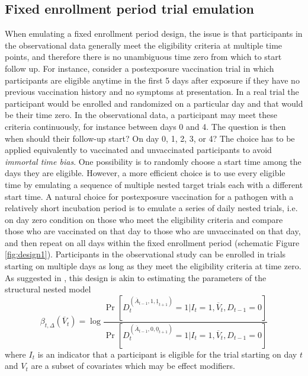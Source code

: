 \begin{appendices}
\begin{refsection}
    \subsection{Fixed enrollment period trial emulation}\label{sec:fixed_emulation}
    When emulating a fixed enrollment period design, the issue is that participants in the observational data generally meet the eligibility criteria at multiple time points, and therefore there is no unambiguous time zero from which to start follow up. For instance, consider a postexposure vaccination trial in which participants are eligible anytime in the first 5 days after exposure if they have no previous vaccination history and no symptoms at presentation. In a real trial the participant would be enrolled and randomized on a particular day and that would be their time zero. In the observational data, a participant may meet these criteria continuously, for instance between days 0 and 4. The question is then when should their follow-up start? On day 0, 1, 2, 3, or 4? The choice has to be applied equivalently to vaccinated and unvaccinated participants to avoid \textit{immortal time bias}. One possibility is to randomly choose a start time among the days they are eligible. However, a more efficient choice is to use every eligible time by emulating a sequence of multiple nested target trials each with a different start time. A natural choice for postexposure vaccination for a pathogen with a relatively short incubation period is to emulate a series of daily nested trials, i.e. on day zero condition on those who meet the eligibility criteria and compare those who are vaccinated on that day to those who are unvaccinated on that day, and then repeat on all days within the fixed enrollment period (schematic Figure \ref{fig:design1}). Participants in the observational study can be enrolled in trials starting on multiple days as long as they meet the eligibility criteria at time zero. As suggested in \cite{guo_discussion_2021-1}, this design is akin to estimating the parameters of the structural nested model
    \begin{equation*}
        \beta_{t, \Delta}(\overline{V}_t) = \log \frac{\Pr[D_t^{(\overline{A}_{t-1}, 1, \underline{1}_{t+1})}  = 1| I_t = 1, \overline{V}_t, D_{t-1} = 0]}{\Pr[D_t^{(\overline{A}_{t-1}, 0, \underline{0}_{t+1})} = 1 |  I_t = 1, \overline{V}_t, D_{t-1} = 0]}
    \end{equation*}
    where $I_t$ is an indicator that a participant is eligible for the trial starting on day $t$ and $V_t$ are a subset of covariates which may be effect modifiers.


\end{refsection}
\end{appendices}
